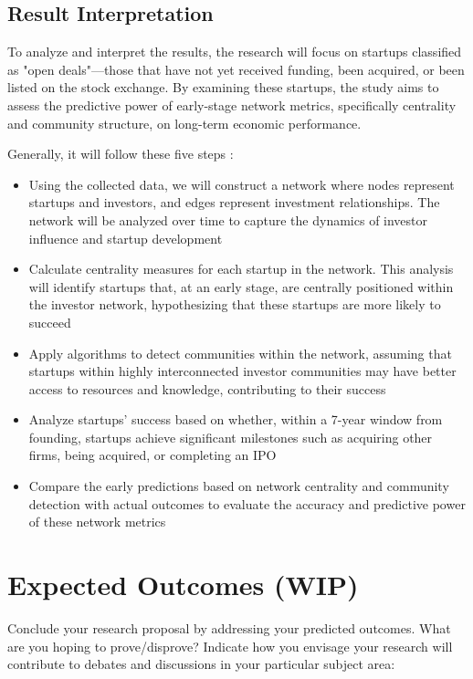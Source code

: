 \documentclass[a4paper,11pt]{article}
\begin{document}
\subsection{Result Interpretation}
To analyze and interpret the results, the research will focus on startups classified as "open deals"—those that have not yet received funding, been acquired, or been listed on the stock exchange. By examining these startups, the study aims to assess the predictive power of early-stage network metrics, specifically centrality and community structure, on long-term economic performance.

Generally, it will follow these five steps : 
\begin{itemize}
    \item Using the collected data, we will construct a network where nodes represent startups and investors, and edges represent investment relationships. The network will be analyzed over time to capture the dynamics of investor influence and startup development
    \item Calculate centrality measures for each startup in the network. This analysis will identify startups that, at an early stage, are centrally positioned within the investor network, hypothesizing that these startups are more likely to succeed
    \item Apply algorithms to detect communities within the network, assuming that startups within highly interconnected investor communities may have better access to resources and knowledge, contributing to their success
    \item Analyze startups' success based on whether, within a 7-year window from founding, startups achieve significant milestones such as acquiring other firms, being acquired, or completing an IPO
    \item Compare the early predictions based on network centrality and community detection with actual outcomes to evaluate the accuracy and predictive power of these network metrics
\end{itemize}

\section{Expected Outcomes (WIP)}

Conclude your research proposal by addressing your predicted outcomes. What are you hoping to prove/disprove? Indicate how you envisage your research will contribute to debates and discussions in your particular subject area:
\end{document}
